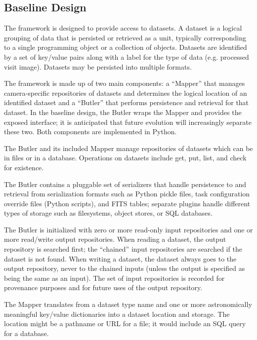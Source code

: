 \documentclass[DM,lsstdraft,toc]{lsstdoc}
\begin{document}
\subsection{Baseline Design}\label{butler-design}

The framework is designed to provide access to datasets. A dataset is a logical
grouping of data that is persisted or retrieved as a unit, typically
corresponding to a single programming object or a collection of objects.
Datasets are identified by a set of key/value pairs along with a label for the
type of data (e.g. processed visit image).  Datasets may be persisted into
multiple formats.

The framework is made up of two main components: a ``Mapper'' that manages
camera-specific repositories of datasets and determines the
logical location of an identified dataset and a ``Butler'' that performs
persistence and retrieval for that dataset.  In the baseline design, the Butler
wraps the Mapper and provides the exposed interface; it is anticipated that
future evolution will increasingly separate these two.  Both components are
implemented in Python.

The Butler and its included Mapper manage repositories
of datasets which can be in files or in a database.
Operations on datasets include get, put, list, and check for existence.

The Butler contains a pluggable set of serializers that handle persistence to
and retrieval from serialization formats such as Python pickle files, task
configuration override files (Python scripts), and FITS tables; separate
plugins handle different types of storage such as filesystems, object stores,
or SQL databases.

The Butler is initialized with zero or more read-only input repositories and
one or more read/write output repositories. When reading a dataset, the output
repository is searched first; the ``chained'' input repositories are searched
if the dataset is not found. When writing a dataset, the dataset always goes to
the output repository, never to the chained inputs (unless the output is
specified as being the same as an input).  The set of input repositories is
recorded for provenance purposes and for future uses of the output repository.

The Mapper translates from a dataset type name and one or more
astronomically meaningful key/value dictionaries into a dataset location
and storage. The location might be a pathname or URL for a file; it
would include an SQL query for a database.
\end{document}
